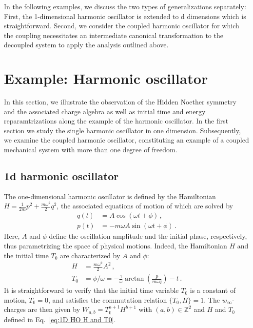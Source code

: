 \documentclass[twocolumn,notitlepage,superscriptaddress, nofootinbib,nobibnotes, aps,prd,10pt]{revtex4-1}%
\begin{document}
In the following examples, we discuss the two types of generalizations separately: First, the 1-dimensional harmonic oscillator is extended to d dimensions which is straightforward. Second, we consider the coupled harmonic oscillator for which the coupling necessitates an intermediate canonical transformation to the decoupled system to apply the analysis outlined above. 

\section{Example: Harmonic oscillator}\label{sec:Example}

In this section, we illustrate the observation of the Hidden Noether symmetry and the associated charge algebra as well as initial time and energy reparamtrizations along the example of the harmonic oscillator. In the first section we study the single harmonic oscillator in one dimension. Subsequently, we examine the coupled harmonic oscillator, constituting an example of a coupled mechanical system with more than one degree of freedom.

\subsection{1d harmonic oscillator}\label{sec:1D HO}

The one-dimensional harmonic oscillator is defined by the Hamiltonian $H = \frac{1}{2m}p^2+\frac{m\omega^2}{2}q^2$, the associated equations of motion of which are solved by
%
\begin{subequations}
\begin{align}
    q(t) &= A\cos(\omega t+\phi)\, ,\\[7pt]
    p(t) &= -m\omega A\sin(\omega t +\phi)\, .
\end{align}
\end{subequations}
%
Here, $A$ and $\phi$ define the oscillation amplitude and the initial phase, respectively, thus parametrizing the space of physical motions. Indeed, the Hamiltonian $H$ and the initial time $T_0$ are characterized by $A$ and $\phi$:
%
\begin{subequations}\label{eq:1D HO H and T0}
\begin{align}
    H &= \frac{m\omega^2}{2}A^2\, ,\\[7pt]
    T_0 &= \phi/\omega = -\frac{1}{\omega}\arctan\left(\frac{p}{m\omega q}\right) -t\, .
\end{align}
\end{subequations}
%
It is straightforward to verify that the initial time variable $T_0$ is a constant of motion, $\dot{T}_0 = 0$, and satisfies the commutation relation $\{T_0,H\} = 1$. The $w_\infty$-charges are then given by $W_{a,b} = T_0^{a+1}H^{b+1}$ with $(a,b)\in\mathbb{Z}^2$ and $H$ and $T_0$ defined in Eq.~\eqref{eq:1D HO H and T0}.  
\end{document}
